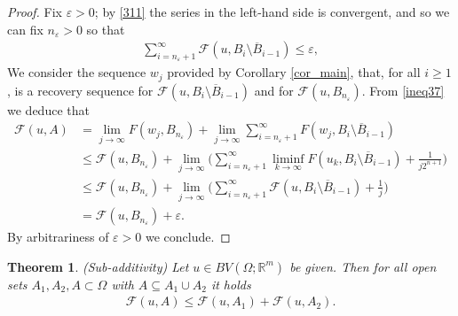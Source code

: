 \documentclass[a4paper,11pt]{article}
\numberwithin{equation}{section}
\newtheorem{theorem}{Theorem}[section]
\newcommand{\Om}{\Omega}
\newcommand{\R}{\mathbb{R}}
\begin{document}
\begin{proof}
Fix $\varepsilon>0$; by \eqref{311} the series in the left-hand side is convergent, and so we can fix $n_\varepsilon>0$ so that 
\begin{align}
	\sum_{i=n_\varepsilon+1}^\infty 	\mathcal F(u,B_i\setminus \overline B_{i-1})\leq\varepsilon,
\end{align}
 We consider the sequence $w_j$ provided by  Corollary \ref{cor_main}, that, for all $i\geq1$, is a recovery sequence for $\mathcal F(u,B_i\setminus \overline B_{i-1})$ and for $\mathcal F(u,B_{n_\varepsilon})$. 
From \eqref{ineq37} we deduce that 
\begin{align*}
	\mathcal F(u,A)&=\lim_{j\rightarrow \infty}F(w_j,B_{n_\varepsilon})+\lim_{j\rightarrow\infty}\sum_{i=n_\varepsilon+1}^\infty F(w_j,B_i\setminus \overline B_{i-1})\\
	&\leq \mathcal F(u,B_{n_\varepsilon})+\lim_{j\rightarrow\infty}\Big(\sum_{i=n_\varepsilon+1}^\infty\liminf_{k\rightarrow \infty}F(u_k,B_i\setminus\overline  B_{i-1})+\frac{1}{j2^{n+1}}\Big)\\
	&\leq \mathcal F(u,B_{n_\varepsilon})+\lim_{j\rightarrow\infty}\Big(\sum_{i=n_\varepsilon+1}^\infty	\mathcal F(u,B_i\setminus \overline B_{i-1})+\frac{1}{j}\Big)\\
	&= \mathcal F(u,B_{n_\varepsilon})+\varepsilon.
\end{align*}
By arbitrariness of $\varepsilon>0$ we conclude.
\end{proof}

\begin{theorem}(Sub-additivity)
	Let  $u\in BV(\Om;\R^m)$ be given. Then for all open sets $A_1,A_2,A\subset\Om$ with $A\subseteq A_1\cup A_2$ it holds
	\begin{align*}
\mathcal F(u,A)\leq \mathcal F(u,A_1)+\mathcal F(u,A_2).
	\end{align*} 
\end{theorem}
\end{document}
